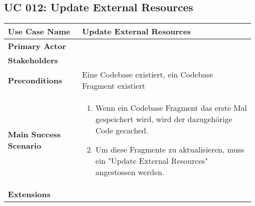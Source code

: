 \subsection{UC 012: Update External Resources}
\label{uc:012-update-external-res}

\begin{tabular}{|l|p{}|}
\hline
\textbf{Use Case Name} 	&	Update External Resources	\\ \hline
\textbf{Primary Actor} 	&		\\ \hline
\textbf{Stakeholders}	&		\\ \hline
\textbf{Preconditions}	&	Eine Codebase existiert, ein Codebase Fragment existiert	\\ \hline
\textbf{Main Success Scenario}	&
\begin{enumerate}
	\item Wenn ein Codebase Fragment das erste Mal gespeichert wird, wird der dazugehörige Code gecached.
	\item Um diese Fragmente zu aktualisieren, muss ein "Update External Resources" angestossen werden.
\end{enumerate}
\\ \hline
\textbf{Extensions}	& 	\\ \hline
\end{tabular}